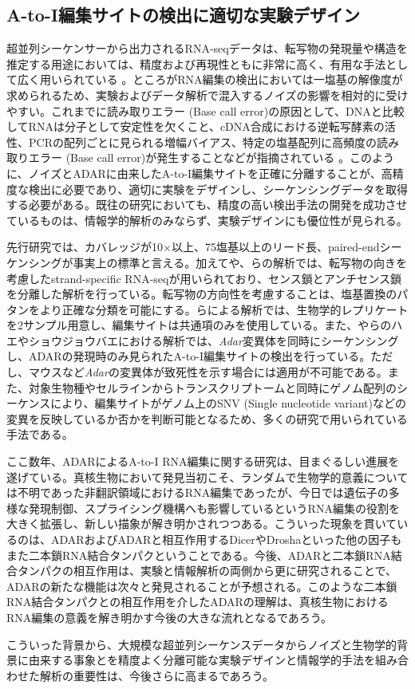 \subsection{A-to-I編集サイトの検出に適切な実験デザイン}
超並列シーケンサーから出力されるRNA-seqデータは、転写物の発現量や構造を推定する用途においては、精度および再現性ともに非常に高く、有用な手法として広く用いられている \citep{MarMasMan0809, MorWilMcC0807}。ところがRNA編集の検出においては一塩基の解像度が求められるため、実験およびデータ解析で混入するノイズの影響を相対的に受けやすい。これまでに読み取りエラー (Base call error)の原因として、DNAと比較してRNAは分子として安定性を欠くこと、cDNA合成における逆転写酵素の活性、PCRの配列ごとに見られる増幅バイアス、特定の塩基配列に高頻度の読み取りエラー (Base call error)が発生することなどが指摘されている \citep{NakOshMor1107, AirRosChe11, pmid22099972}。このように、ノイズとADARに由来したA-to-I編集サイトを正確に分離することが、高精度な検出に必要であり、適切に実験をデザインし、シーケンシングデータを取得する必要がある。既往の研究においても、精度の高い検出手法の開発を成功させているものは、情報学的解析のみならず、実験デザインにも優位性が見られる。
\par
先行研究では、カバレッジが10$\times$以上、75塩基以上のリード長、paired-endシーケンシングが事実上の標準と言える。加えて\cite{Ramaswami:2012aa}や\cite{Peng:2012aa}、\cite{Zhu:2013aa}らの解析では、転写物の向きを考慮したstrand-specific RNA-seqが用いられており、センス鎖とアンチセンス鎖を分離した解析を行っている。転写物の方向性を考慮することは、塩基置換のパタンをより正確な分類を可能にする。\cite{Rodriguez:2012aa}らによる解析では、生物学的レプリケートを2サンプル用意し、編集サイトは共通項のみを使用している。また、\cite{BahLeeLi1201}や\cite{Rodriguez:2012aa}らのハエやショウジョウバエにおける解析では、\textit{Adar}変異体を同時にシーケンシングし、ADARの発現時のみ見られたA-to-I編集サイトの検出を行っている。ただし、マウスなど\textit{Adar}の変異体が致死性を示す場合には適用が不可能である。また、対象生物種やセルラインからトランスクリプトームと同時にゲノム配列のシーケンスにより、編集サイトがゲノム上のSNV (Single nucleotide variant)などの変異を反映しているか否かを判断可能となるため、多くの研究で用いられている手法である。
\par
ここ数年、ADARによるA-to-I RNA編集に関する研究は、目まぐるしい進展を遂げている。真核生物において発見当初こそ、ランダムで生物学的意義については不明であった非翻訳領域におけるRNA編集であったが、今日では遺伝子の多様な発現制御、スプライシング機構へも影響しているというRNA編集の役割を大きく拡張し、新しい描象が解き明かされつつある。こういった現象を貫いているのは、ADARおよびADARと相互作用するDicerやDroshaといった他の因子もまた二本鎖RNA結合タンパクということである。今後、ADARと二本鎖RNA結合タンパクの相互作用は、実験と情報解析の両側から更に研究されることで、ADARの新たな機能は次々と発見されることが予想される。このような二本鎖RNA結合タンパクとの相互作用を介したADARの理解は、真核生物におけるRNA編集の意義を解き明かす今後の大きな流れとなるであろう。
\par
こういった背景から、大規模な超並列シーケンスデータからノイズと生物学的背景に由来する事象とを精度よく分離可能な実験デザインと情報学的手法を組み合わせた解析の重要性は、今後さらに高まるであろう。
